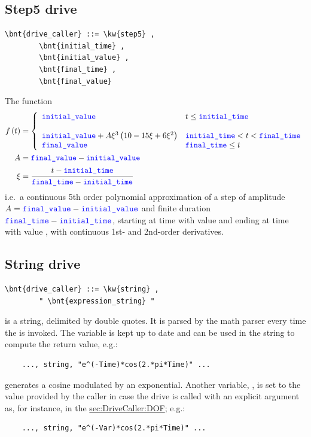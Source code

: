 \subsection{Step5 drive}
\begin{Verbatim}[commandchars=\\\{\}]
    \bnt{drive_caller} ::= \kw{step5} ,
        \bnt{initial_time} , 
        \bnt{initial_value} ,
        \bnt{final_time} ,
        \bnt{final_value}
\end{Verbatim}    
The function
\begin{align}
	f\plbr{t} &= 
	\lcubr{\matr{ll}{
		\nt{initial\_value} %
			& t \le \nt{initial\_time} \\
		\\
		\nt{initial\_value} + A \xi^3 \plbr{10 - 15 \xi + 6 \xi^2}
			& \nt{initial\_time} < t < \nt{final\_time}
		\\
		\nt{final\_value}
			& \nt{final\_time} \le t \\
	}}
	\\
	A &= \nt{final\_value} - \nt{initial\_value}
	\nonumber \\
	\xi &= \cfrac{t - \nt{initial\_time}}{\nt{final\_time} - \nt{initial\_time}}
	\nonumber 
\end{align}
i.e.\ a continuous 5th order polynomial approximation of a step of amplitude $A = \textcolor{blue}{\texttt{final\_value}} - \textcolor{blue}{\texttt{initial\_value}}$
and finite duration $\textcolor{blue}{\texttt{final\_time}} - \textcolor{blue}{\texttt{initial\_time}}$,
starting at time  with value  and ending at time  with value ,
with continuous 1st- and 2nd-order derivatives.

\subsection{String drive}
\begin{Verbatim}[commandchars=\\\{\}]
    \bnt{drive_caller} ::= \kw{string} ,
        " \bnt{expression_string} "
\end{Verbatim}
 is a string, delimited by double quotes.
It is parsed by the math parser every time 
the  is invoked.
The variable  is kept up to date and can be used in the 
string to compute the return value, e.g.:
\begin{verbatim}
    ..., string, "e^(-Time)*cos(2.*pi*Time)" ...
\end{verbatim}
generates a cosine modulated by an exponential.
Another variable, , is set to the value provided by the caller
in case the drive is called with an explicit argument as, for instance,
in the \hyperref{\kw{dof drive}}{\kw{dof drive} (see Section~}{)}{sec:DriveCaller:DOF};
e.g.:
\begin{verbatim}
    ..., string, "e^(-Var)*cos(2.*pi*Time)" ...
\end{verbatim}

